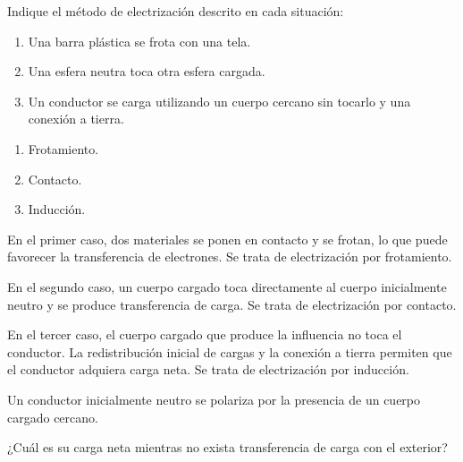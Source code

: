
\begin{ejercicio}

Indique el método de electrización descrito en cada situación:

\begin{enumerate}
    \item Una barra plástica se frota con una tela.
    \item Una esfera neutra toca otra esfera cargada.
    \item Un conductor se carga utilizando un cuerpo cercano sin tocarlo y
    una conexión a tierra.
\end{enumerate}

\end{ejercicio}

\begin{respuesta}

\begin{enumerate}
    \item Frotamiento.
    \item Contacto.
    \item Inducción.
\end{enumerate}

\end{respuesta}

\begin{explicacion}

En el primer caso, dos materiales se ponen en contacto y se frotan, lo que
puede favorecer la transferencia de electrones. Se trata de electrización
por frotamiento.

En el segundo caso, un cuerpo cargado toca directamente al cuerpo inicialmente
neutro y se produce transferencia de carga. Se trata de electrización por
contacto.

En el tercer caso, el cuerpo cargado que produce la influencia no toca el
conductor. La redistribución inicial de cargas y la conexión a tierra permiten
que el conductor adquiera carga neta. Se trata de electrización por inducción.

\end{explicacion}



\begin{ejercicio}

Un conductor inicialmente neutro se polariza por la presencia de un cuerpo
cargado cercano.

¿Cuál es su carga neta mientras no exista transferencia de carga con el
exterior?

\end{ejercicio}

